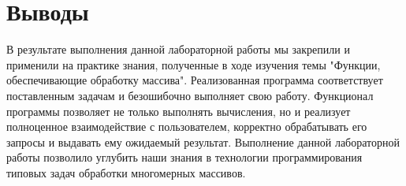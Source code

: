 \section*{Выводы}

В результате выполнения данной лабораторной работы мы закрепили и применили на практике знания,
полученные в ходе изучения темы
"Функции, обеспечивающие обработку массива".
Реализованная программа соответствует поставленным задачам и безошибочно выполняет свою работу.
Функционал программы позволяет не только выполнять вычисления, но и реализует полноценное взаимодействие
с пользователем, корректно обрабатывать его запросы и выдавать ему
ожидаемый результат.
Выполнение данной лабораторной работы позволило углубить наши знания в технологии программирования типовых
задач обработки многомерных массивов.